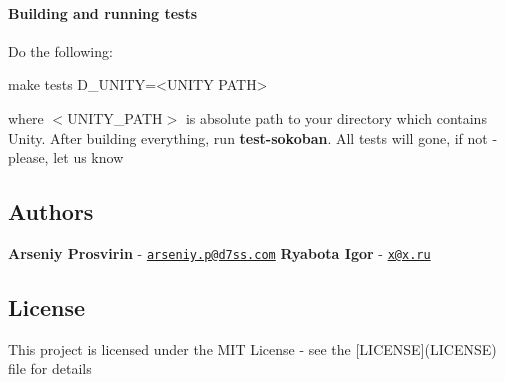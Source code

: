  \paragraph*{Building and running tests}

Do the following\+: 
\begin{DoxyCode}
make tests D\_UNITY=<UNITY PATH>
\end{DoxyCode}
 where $<$\+U\+N\+I\+T\+Y\+\_\+\+P\+A\+T\+H$>$ is absolute path to your directory which contains Unity. After building everything, run {\bfseries test-\/sokoban}. All tests will gone, if not -\/ please, let us know \subsection*{Authors}

{\bfseries Arseniy Prosvirin} -\/ \href{mailto:arseniy.p@d7ss.com}{\tt arseniy.\+p@d7ss.\+com} {\bfseries Ryabota Igor} -\/ \href{mailto:x@x.ru}{\tt x@x.\+ru} \subsection*{License}

This project is licensed under the M\+IT License -\/ see the \mbox{[}L\+I\+C\+E\+N\+SE\mbox{]}(L\+I\+C\+E\+N\+SE) file for details 